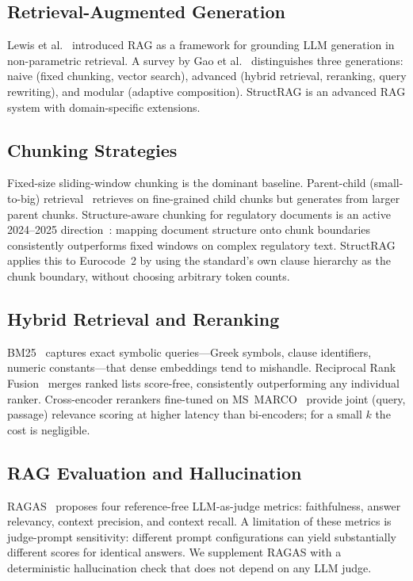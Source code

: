 \documentclass[conference]{IEEEtran}
\begin{document}
\subsection{Retrieval-Augmented Generation}

Lewis et al.~\cite{lewis2020rag} introduced RAG as a framework for
grounding LLM generation in non-parametric retrieval.
A survey by Gao et al.~\cite{gao2023survey} distinguishes three
generations: naive (fixed chunking, vector search), advanced (hybrid
retrieval, reranking, query rewriting), and modular (adaptive
composition).
StructRAG is an advanced RAG system with domain-specific extensions.

\subsection{Chunking Strategies}

Fixed-size sliding-window chunking is the dominant baseline.
Parent-child (small-to-big) retrieval~\cite{gao2023survey} retrieves
on fine-grained child chunks but generates from larger parent chunks.
Structure-aware chunking for regulatory documents is an active
2024--2025 direction~\cite{wang2024financial}: mapping document
structure onto chunk boundaries consistently outperforms fixed windows
on complex regulatory text.
StructRAG applies this to Eurocode~2 by using the standard's own
clause hierarchy as the chunk boundary, without choosing arbitrary
token counts.

\subsection{Hybrid Retrieval and Reranking}

BM25~\cite{robertson2009bm25} captures exact symbolic queries---Greek
symbols, clause identifiers, numeric constants---that dense embeddings
tend to mishandle.
Reciprocal Rank Fusion~\cite{cormack2009rrf} merges ranked lists
score-free, consistently outperforming any individual ranker.
Cross-encoder rerankers fine-tuned on MS~MARCO~\cite{nogueira2019passage}
provide joint (query, passage) relevance scoring at higher latency than
bi-encoders; for a small $k$ the cost is negligible.

\subsection{RAG Evaluation and Hallucination}

RAGAS~\cite{es2023ragas} proposes four reference-free LLM-as-judge
metrics: faithfulness, answer relevancy, context precision, and context
recall.
A limitation of these metrics is judge-prompt sensitivity: different
prompt configurations can yield substantially different scores for
identical answers.
We supplement RAGAS with a deterministic hallucination check that does
not depend on any LLM judge.
\end{document}
